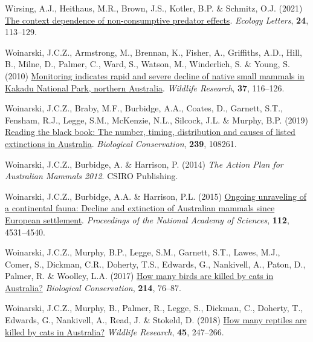 \documentclass[11pt,a4paper,titlepage,twoside,openright]{style/unimelbthesis}
\newenvironment{CSLReferences}%
  {}%
  {\par}
\begin{document}
\begin{mainmatter}
\begin{CSLReferences}{1}{0}
\leavevmode{}%
Wirsing, A.J., Heithaus, M.R., Brown, J.S., Kotler, B.P. \& Schmitz, O.J. (2021) \href{https://doi.org/10.1111/ele.13614}{The context dependence of non-consumptive predator effects}. \emph{Ecology Letters}, \textbf{24}, 113--129.

\leavevmode{}%
Woinarski, J.C.Z., Armstrong, M., Brennan, K., Fisher, A., Griffiths, A.D., Hill, B., Milne, D., Palmer, C., Ward, S., Watson, M., Winderlich, S. \& Young, S. (2010) \href{https://doi.org/10.1071/WR09125}{Monitoring indicates rapid and severe decline of native small mammals in {Kakadu National Park, northern {A}ustralia}}. \emph{Wildlife Research}, \textbf{37}, 116--126.

\leavevmode{}%
Woinarski, J.C.Z., Braby, M.F., Burbidge, A.A., Coates, D., Garnett, S.T., Fensham, R.J., Legge, S.M., McKenzie, N.L., Silcock, J.L. \& Murphy, B.P. (2019) \href{https://doi.org/10.1016/j.biocon.2019.108261}{Reading the black book: The number, timing, distribution and causes of listed extinctions in {A}ustralia}. \emph{Biological Conservation}, \textbf{239}, 108261.

\leavevmode{}%
Woinarski, J.C.Z., Burbidge, A. \& Harrison, P. (2014) \emph{The Action Plan for {{A}ustralian} Mammals 2012}. {CSIRO Publishing}.

\leavevmode{}%
Woinarski, J.C.Z., Burbidge, A.A. \& Harrison, P.L. (2015) \href{https://doi.org/10.1073/pnas.1417301112}{Ongoing unraveling of a continental fauna: Decline and extinction of {{A}ustralian} mammals since {European} settlement}. \emph{Proceedings of the National Academy of Sciences}, \textbf{112}, 4531--4540.

\leavevmode{}%
Woinarski, J.C.Z., Murphy, B.P., Legge, S.M., Garnett, S.T., Lawes, M.J., Comer, S., Dickman, C.R., Doherty, T.S., Edwards, G., Nankivell, A., Paton, D., Palmer, R. \& Woolley, L.A. (2017) \href{https://doi.org/10.1016/j.biocon.2017.08.006}{How many birds are killed by cats in {{A}ustralia}?} \emph{Biological Conservation}, \textbf{214}, 76--87.

\leavevmode{}%
Woinarski, J.C.Z., Murphy, B., Palmer, R., Legge, S., Dickman, C., Doherty, T., Edwards, G., Nankivell, A., Read, J. \& Stokeld, D. (2018) \href{https://doi.org/10.1071/WR17160}{How many reptiles are killed by cats in {{A}ustralia}?} \emph{Wildlife Research}, \textbf{45}, 247--266.


\end{CSLReferences}
\end{mainmatter}
\end{document}
